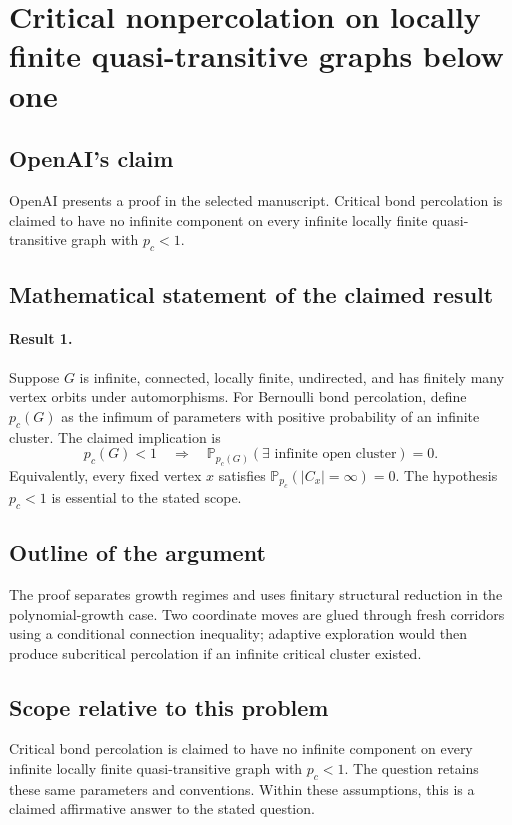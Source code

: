 \documentclass[11pt]{article}
\begin{document}
\section*{Critical nonpercolation on locally finite quasi-transitive graphs below one}

\subsection{OpenAI's claim}
OpenAI presents a proof in the selected manuscript. Critical bond percolation is claimed to have no infinite component on every infinite locally finite quasi-transitive graph with $p_c<1$.

\subsection{Mathematical statement of the claimed result}
\paragraph{Result 1.} Suppose \(G\) is infinite, connected, locally finite, undirected, and has finitely many vertex orbits under automorphisms. For Bernoulli bond percolation, define \(p_c(G)\) as the infimum of parameters with positive probability of an infinite cluster. The claimed implication is
\[
 p_c(G)<1\quad\Longrightarrow\quad
 \mathbb P_{p_c(G)}(\exists\text{ infinite open cluster})=0.
\]
Equivalently, every fixed vertex \(x\) satisfies \(\mathbb P_{p_c}(|C_x|=\infty)=0\). The hypothesis \(p_c<1\) is essential to the stated scope.

\subsection{Outline of the argument}
The proof separates growth regimes and uses finitary structural reduction in the polynomial-growth case. Two coordinate moves are glued through fresh corridors using a conditional connection inequality; adaptive exploration would then produce subcritical percolation if an infinite critical cluster existed.

\subsection{Scope relative to this problem}
Critical bond percolation is claimed to have no infinite component on every infinite locally finite quasi-transitive graph with $p_c<1$. The question retains these same parameters and conventions. Within these assumptions, this is a claimed affirmative answer to the stated question.
\end{document}
